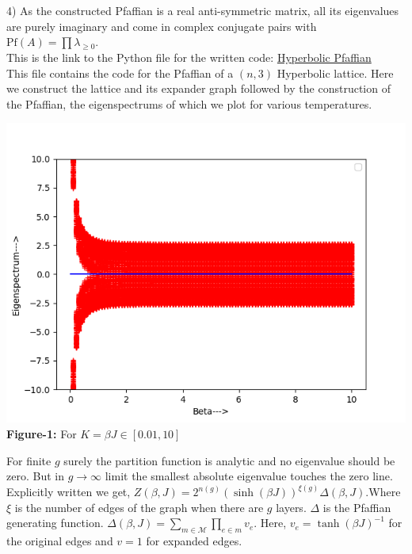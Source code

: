 \documentclass{article}
\begin{document}
	4) As the constructed Pfaffian is a real anti-symmetric matrix, all its eigenvalues are purely imaginary and come in complex conjugate pairs with $\text{Pf}(A)=\prod \lambda_{\geq 0}$. \\
	
	This is the link to the Python file for the written code: \href{https://github.com/ad1729-math/DP-Files/blob/main/Hyperbolic%20Pfaffian.py}{Hyperbolic Pfaffian}\\
	
	This file contains the code for the Pfaffian of a $(n,3)$ Hyperbolic lattice. Here we construct the lattice and its expander graph followed by the construction of the Pfaffian, the eigenspectrums of which we plot for various temperatures. \\
	
	\begin{center}
		\includegraphics[scale=0.5]{Hyperbolic lattice eigenspectrum.png}\\
		\textbf{Figure-1:} For $K=\beta J \in [0.01,10]$\\
	\end{center}
	
	For finite $g$ surely the partition function is analytic and no eigenvalue should be zero. But in $g \to \infty$ limit the smallest absolute eigenvalue touches the zero line. Explicitly written we get, $Z(\beta, J)=2^{n(g)}(\sinh(\beta J))^{\xi(g)}\Delta(\beta, J)$.Where $\xi$ is the number of edges of the graph when there are $g$ layers. $\Delta$ is the Pfaffian generating function. $\Delta(\beta, J)=\sum_{m \in \mathcal{M}}\prod_{e \in m} v_e$. Here, $v_e=\tanh(\beta J)^{-1}$ for the original edges and $v=1$ for expanded edges.\\
	
\end{document}
